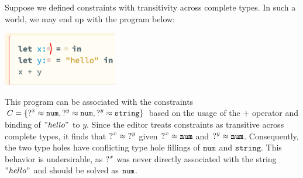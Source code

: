 Suppose we defined constraints with transitivity across complete types. In such a world, we may end up with the program below:
\begin{center}
\includegraphics[width=5cm]{images/constraint_gen_bad_example.png}
\end{center}
This program can be associated with the constraints $C = \{ \mathtt{?}^{x} \approx \mathtt{num}, \mathtt{?}^{y} \approx \mathtt{num}, \mathtt{?}^{y} \approx \mathtt{string} \}$ based on the usage of the $+$ operator and binding of $"hello"$ to $y$. Since the editor treats constraints as transitive across complete types, it finds that $\mathtt{?}^{x} \approx \mathtt{?}^{y}$ given $\mathtt{?}^{x} \approx \mathtt{num}$ and $\mathtt{?}^{y} \approx \mathtt{num}$. Consequently, the two type holes have conflicting type hole fillings of $\mathtt{num}$ and $\mathtt{string}$. This behavior is undersirable, as $\mathtt{?}^x$ was never directly associated with the string $"hello"$ and should be solved as $\mathtt{num}$.


